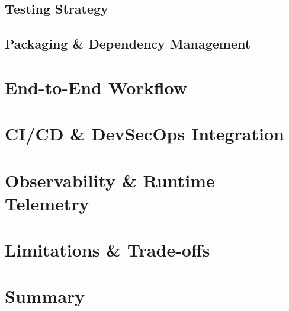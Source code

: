 \subsection{Testing Strategy}

\subsection{Packaging & Dependency Management}

\section{End-to-End Workflow}

\section{CI/CD & DevSecOps Integration}

\section{Observability & Runtime Telemetry}

\section{Limitations & Trade-offs}

\section{Summary}
